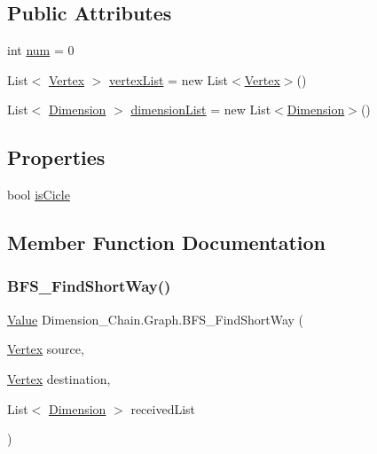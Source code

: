 \subsection*{Public Attributes}
\begin{DoxyCompactItemize}
\item 
int \mbox{\hyperlink{class_dimension___chain_1_1_graph_a787a940fcdc7c2a3e65a53762b983d4f}{num}} = 0
\item 
List$<$ \mbox{\hyperlink{class_dimension___chain_1_1_vertex}{Vertex}} $>$ \mbox{\hyperlink{class_dimension___chain_1_1_graph_a74a6519101a76d81f7ad02c72915648a}{vertex\+List}} = new List$<$\mbox{\hyperlink{class_dimension___chain_1_1_vertex}{Vertex}}$>$()
\item 
List$<$ \mbox{\hyperlink{class_dimension___chain_1_1_dimension}{Dimension}} $>$ \mbox{\hyperlink{class_dimension___chain_1_1_graph_a97809fd98170fabe659b9de4c9202605}{dimension\+List}} = new List$<$\mbox{\hyperlink{class_dimension___chain_1_1_dimension}{Dimension}}$>$()
\end{DoxyCompactItemize}
\subsection*{Properties}
\begin{DoxyCompactItemize}
\item 
bool \mbox{\hyperlink{class_dimension___chain_1_1_graph_a3b83aa20522a80c1e33ee1975a705278}{is\+Cicle}}
\end{DoxyCompactItemize}


\subsection{Member Function Documentation}
\mbox{\label{class_dimension___chain_1_1_graph_a3817dc05a66fc09a8655ac35a63434a2}} 
\subsubsection{\texorpdfstring{B\+F\+S\+\_\+\+Find\+Short\+Way()}{BFS\_FindShortWay()}}
{\footnotesize\ttfamily \mbox{\hyperlink{class_dimension___chain_1_1_value}{Value}} Dimension\+\_\+\+Chain.\+Graph.\+B\+F\+S\+\_\+\+Find\+Short\+Way (\begin{DoxyParamCaption}\item[{\mbox{\hyperlink{class_dimension___chain_1_1_vertex}{Vertex}}}]{source,  }\item[{\mbox{\hyperlink{class_dimension___chain_1_1_vertex}{Vertex}}}]{destination,  }\item[{List$<$ \mbox{\hyperlink{class_dimension___chain_1_1_dimension}{Dimension}} $>$}]{received\+List }\end{DoxyParamCaption})}


